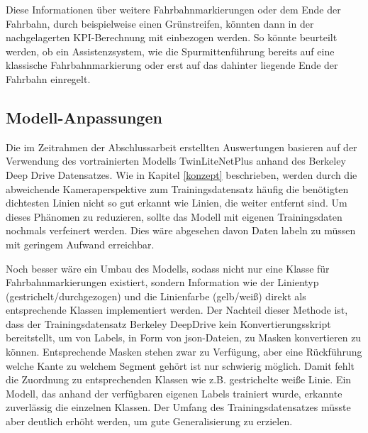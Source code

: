     Diese Informationen über weitere Fahrbahnmarkierungen oder dem Ende der Fahrbahn, durch beispielweise einen Grünstreifen, könnten dann in der nachgelagerten KPI-Berechnung mit einbezogen werden.
    So könnte beurteilt werden, ob ein Assistenzsystem, wie die Spurmittenführung bereits auf eine klassische Fahrbahnmarkierung oder erst auf das dahinter liegende Ende der Fahrbahn einregelt.


    \subsection{Modell-Anpassungen}
    Die im Zeitrahmen der Abschlussarbeit erstellten Auswertungen basieren auf der Verwendung des vortrainierten Modells TwinLiteNetPlus anhand des Berkeley Deep Drive Datensatzes.
    Wie in Kapitel \ref{konzept} beschrieben, werden durch die abweichende Kameraperspektive zum Trainingsdatensatz häufig die benötigten dichtesten Linien nicht so gut erkannt wie Linien, die weiter entfernt sind.
    Um dieses Phänomen zu reduzieren, sollte das Modell mit eigenen Trainingsdaten nochmals verfeinert werden.
    Dies wäre abgesehen davon Daten labeln zu müssen mit geringem Aufwand erreichbar.

    Noch besser wäre ein Umbau des Modells, sodass nicht nur eine Klasse für Fahrbahnmarkierungen existiert, sondern Information wie der Linientyp (gestrichelt/durchgezogen) und die Linienfarbe (gelb/wei{\ss}) direkt als entsprechende Klassen implementiert werden.
    Der Nachteil dieser Methode ist, dass der Trainingsdatensatz Berkeley DeepDrive kein Konvertierungsskript bereitstellt, um von Labels, in Form von json-Dateien, zu Masken konvertieren zu können.
    Entsprechende Masken stehen zwar zu Verfügung, aber eine Rückführung welche Kante zu welchem Segment gehört ist nur schwierig möglich. Damit fehlt die Zuordnung zu entsprechenden Klassen wie z.B. gestrichelte wei{\ss}e Linie.
    Ein Modell, das anhand der verfügbaren eigenen Labels trainiert wurde, erkannte zuverlässig die einzelnen Klassen. Der Umfang des Trainingsdatensatzes müsste aber deutlich erhöht werden, um gute Generalisierung zu erzielen. %

    
